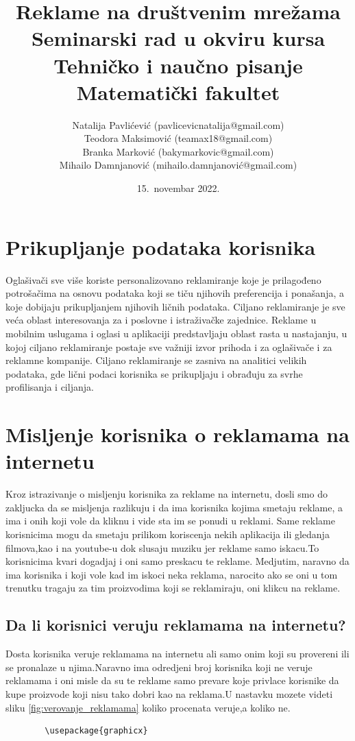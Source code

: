 \documentclass[a4paper]{article}
\title{Reklame na društvenim mrežama\\ \small{Seminarski rad u okviru kursa\\Tehničko i naučno pisanje\\ Matematički fakultet}}
\author{Natalija Pavlićević (pavlicevicnatalija@gmail.com)\\ Teodora Maksimović (teamax18@gmail.com)\\ Branka Marković (bakymarkovic@gmail.com)\\ Mihailo Damnjanović (mihailo.damnjanović@gmail.com)}
\date{15.~novembar 2022.}
\begin{document}
	
	\section{Prikupljanje podataka korisnika}
	\label{sec:podaci}
	Oglašivači sve više koriste personalizovano reklamiranje koje je prilagođeno potrošačima na osnovu podataka koji se tiču njihovih preferencija i ponašanja, a koje dobijaju prikupljanjem njihovih ličnih podataka. Ciljano reklamiranje je sve veća oblast interesovanja za i poslovne i istraživačke zajednice. Reklame u mobilnim uslugama i oglasi u aplikaciji predstavljaju oblast rasta u nastajanju, u kojoj ciljano reklamiranje postaje sve važniji izvor prihoda i za oglašivače i za reklamne kompanije. Ciljano reklamiranje se zasniva na analitici velikih podataka, gde lični podaci korisnika se prikupljaju i obrađuju za svrhe profilisanja i ciljanja.
	

	\section{Misljenje korisnika o reklamama na internetu}
	\label{sec:misljenje}
	Kroz istrazivanje o misljenju korisnika za reklame na internetu, dosli smo do zakljucka da se misljenja razlikuju i da ima korisnika kojima smetaju reklame, a ima i onih koji vole da kliknu i vide sta im se ponudi u reklami.
	Same reklame korisnicima mogu da smetaju prilikom koriscenja nekih aplikacija ili gledanja filmova,kao i na youtube-u dok slusaju muziku jer reklame samo iskacu.To korisnicima kvari dogadjaj i oni samo preskacu te reklame.
	Medjutim, naravno da ima korisnika i koji vole kad im iskoci neka reklama, narocito ako se oni u tom trenutku tragaju za tim proizvodima koji se reklamiraju, oni klikcu na reklame.
	\subsection{Da li korisnici veruju reklamama na internetu?}
	\label{subsec:veovanje_reklamama}
	Dosta korisnika veruje reklamama na internetu ali samo onim koji su provereni ili se pronalaze u njima.Naravno ima odredjeni broj korisnika koji ne veruje reklamama i oni misle da su te reklame samo prevare koje privlace korisnike da kupe proizvode koji nisu tako dobri kao na reklama.U nastavku mozete videti sliku \ref{fig:verovanje_reklamama} koliko procenata veruje,a koliko ne.
	\begin{verbatim}
		\usepackage{graphicx}
	\end{verbatim}
	
\end{document}
